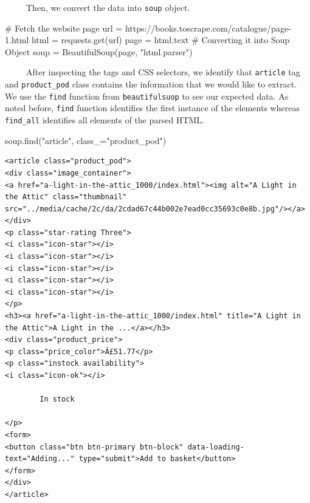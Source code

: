 \documentclass[
  letterpaper,
  DIV=11,
  numbers=noendperiod]{scrreprt}
\newenvironment{Shaded}{\begin{snugshade}}{\end{snugshade}}
\newcommand{\CommentTok}[1]{\textcolor[rgb]{0.37,0.37,0.37}{#1}}
\newcommand{\NormalTok}[1]{\textcolor[rgb]{0.00,0.23,0.31}{#1}}
\newcommand{\OperatorTok}[1]{\textcolor[rgb]{0.37,0.37,0.37}{#1}}
\newcommand{\StringTok}[1]{\textcolor[rgb]{0.13,0.47,0.30}{#1}}
\begin{document}
~~~~~Then, we convert the data into \texttt{soup} object.

\begin{Shaded}
\begin{Highlighting}[]
\CommentTok{\# Fetch the website page }
\NormalTok{url }\OperatorTok{=} \StringTok{\textquotesingle{}https://books.toscrape.com/catalogue/page{-}1.html\textquotesingle{}}
\NormalTok{html }\OperatorTok{=}\NormalTok{ requests.get(url)}
\NormalTok{page }\OperatorTok{=}\NormalTok{ html.text}
\CommentTok{\# Converting it into Soup Object }
\NormalTok{soup }\OperatorTok{=}\NormalTok{ BeautifulSoup(page, }\StringTok{"html.parser"}\NormalTok{)}
\end{Highlighting}
\end{Shaded}

~~~~~After inspecting the tags and CSS selectors, we identify that
\texttt{article} tag and \texttt{product\_pod} class contains the
information that we would like to extract. We use the \texttt{find}
function from \texttt{beautifulsuop} to see our expected data. As noted
before, \texttt{find} function identifies the first instance of the
elements whereas \texttt{find\_all} identifies all elements of the
parsed HTML.

\begin{Shaded}
\begin{Highlighting}[]
\NormalTok{soup.find(}\StringTok{"article"}\NormalTok{, class\_}\OperatorTok{=}\StringTok{"product\_pod"}\NormalTok{)}
\end{Highlighting}
\end{Shaded}

\begin{verbatim}
<article class="product_pod">
<div class="image_container">
<a href="a-light-in-the-attic_1000/index.html"><img alt="A Light in the Attic" class="thumbnail" src="../media/cache/2c/da/2cdad67c44b002e7ead0cc35693c0e8b.jpg"/></a>
</div>
<p class="star-rating Three">
<i class="icon-star"></i>
<i class="icon-star"></i>
<i class="icon-star"></i>
<i class="icon-star"></i>
<i class="icon-star"></i>
</p>
<h3><a href="a-light-in-the-attic_1000/index.html" title="A Light in the Attic">A Light in the ...</a></h3>
<div class="product_price">
<p class="price_color">Â£51.77</p>
<p class="instock availability">
<i class="icon-ok"></i>
    
        In stock
    
</p>
<form>
<button class="btn btn-primary btn-block" data-loading-text="Adding..." type="submit">Add to basket</button>
</form>
</div>
</article>
\end{verbatim}
\end{document}
